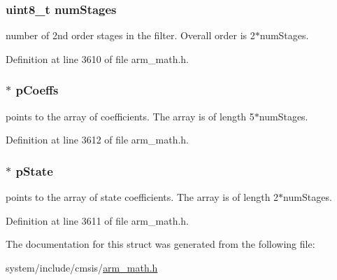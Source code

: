 \subsubsection[{\texorpdfstring{num\+Stages}{numStages}}]{\setlength{\rightskip}{0pt plus 5cm}uint8\+\_\+t num\+Stages}\hypertarget{structarm__biquad__cascade__df2_t__instance__f32_a3615af038f56917909e0370c11bc2ec7}{}\label{structarm__biquad__cascade__df2_t__instance__f32_a3615af038f56917909e0370c11bc2ec7}
number of 2nd order stages in the filter. Overall order is 2$\ast$num\+Stages. 

Definition at line 3610 of file arm\+\_\+math.\+h.

\subsubsection[{\texorpdfstring{p\+Coeffs}{pCoeffs}}]{$\ast$ p\+Coeffs}\hypertarget{structarm__biquad__cascade__df2_t__instance__f32_aacbb8dd8eeba4b21fc2bb40076405ee3}{}\label{structarm__biquad__cascade__df2_t__instance__f32_aacbb8dd8eeba4b21fc2bb40076405ee3}
points to the array of coefficients. The array is of length 5$\ast$num\+Stages. 

Definition at line 3612 of file arm\+\_\+math.\+h.

\subsubsection[{\texorpdfstring{p\+State}{pState}}]{$\ast$ p\+State}\hypertarget{structarm__biquad__cascade__df2_t__instance__f32_a335c87e6fdc4b96601d95a5de8b9c463}{}\label{structarm__biquad__cascade__df2_t__instance__f32_a335c87e6fdc4b96601d95a5de8b9c463}
points to the array of state coefficients. The array is of length 2$\ast$num\+Stages. 

Definition at line 3611 of file arm\+\_\+math.\+h.



The documentation for this struct was generated from the following file\+:\begin{DoxyCompactItemize}
\item 
system/include/cmsis/\hyperlink{arm__math_8h}{arm\+\_\+math.\+h}\end{DoxyCompactItemize}
